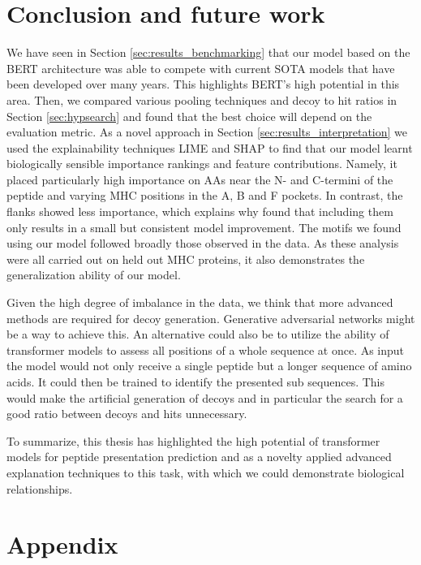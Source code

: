 \documentclass[msc,deptreport,ai]{infthesis} %
\begin{document}
\chapter{Conclusion and future work}
\label{chapter:conclusion}
	We have seen in Section \ref{sec:results_benchmarking} that our model based on the \gls{BERT} architecture was able to compete with current \gls{SOTA} models that have been developed over many years. This highlights \gls{BERT}'s high potential in this area. Then, we compared various pooling techniques and decoy to hit ratios in Section \ref{sec:hypsearch} and found that the best choice will depend on the evaluation metric. As a novel approach in Section \ref{sec:results_interpretation} we used the explainability techniques \gls{LIME} and \gls{SHAP} to find that our model learnt biologically sensible importance rankings and feature contributions. Namely, it placed particularly high importance on \glspl{AA} near the N- and C-termini of the peptide and varying \gls{MHC}  positions in the A, B and F pockets. In contrast, the flanks showed less importance, which explains why \cite{odonnell_mhcflurry_2020} found that including them only results in a small but consistent model improvement.  The motifs we found using our model followed broadly those observed in the data. As these analysis were all carried out on held out \gls{MHC} proteins, it also demonstrates the generalization ability of our model.

Given the high degree of imbalance in the data, we think that more advanced methods are required for decoy generation. Generative adversarial networks might be a way to achieve this. An alternative could also be to utilize the ability of transformer models to assess all positions of a whole sequence at once. As input the model would not only receive a single peptide but a longer sequence of amino acids. It could then be trained to identify the presented sub sequences. This would make the artificial generation of decoys and in particular the search for a good ratio between decoys and hits unnecessary.

	To summarize, this thesis has highlighted the high potential of transformer models for peptide presentation prediction and as a novelty applied advanced explanation techniques to this task, with which we could demonstrate biological relationships.
	
\chapter{Appendix}
	\vspace{-5mm}
\end{document}
